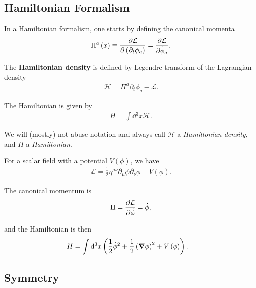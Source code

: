 
\subsection{Hamiltonian Formalism}


In a Hamiltonian formalism, one starts by defining the canonical momenta
\begin{align}
    \Pi^{a} \left( x \right) \equiv \pdv{\mathcal{L}}{\left( \partial_t \phi_a \right) } = \pdv{\mathcal{L}}{\dot{\phi}_a}
.\end{align}

\begin{definition}
    The \textbf{Hamiltonian density} is defined by Legendre transform  of the Lagrangian density
\begin{align}
    \mathcal{H} = \Pi^{a} \partial_t \phi_a - \mathcal{L}
.\end{align}
\end{definition}

The Hamiltonian is given by
\begin{align}
    H = \int \dd{^3x} \mathcal{H}
.\end{align}

We will (mostly) not abuse notation and always call $\mathcal{H}$ a \textit{Hamiltonian density}, and $H$ a \textit{Hamiltonian}.

\begin{example}
    For a scalar field with a potential $V\left( \phi \right) $, we have
    \begin{align}
        \mathcal{L} = \frac{1}{2} \eta^{\mu \nu} \partial_\mu \phi \partial_\nu \phi - V \left( \phi \right) 
    .\end{align}

    The canonical momentum is
    \begin{align}
        \Pi = \pdv{\mathcal{L}}{\dot{\phi}} = \dot{\phi}
    ,\end{align}

    and the Hamiltonian is then
    \begin{align}
        H &=  \int \dd{^3 x} \left( \frac{1}{2} \dot{\phi}^2 + \frac{1}{2}\left( \grad \phi \right)^2 + V\left( \phi \right)  \right) 
    .\end{align}
\end{example}

\subsection{Symmetry}

